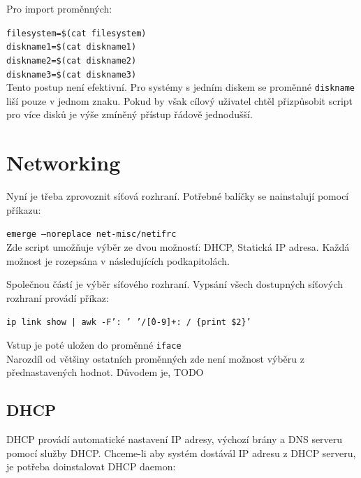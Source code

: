 \documentclass[12pt,a4paper,twoside,]{article}
\begin{document}
\hspace*{-1.5em}Pro import proměnných:

\texttt{filesystem=\$(cat filesystem)}\\
\hspace*{1.5em}\texttt{diskname1=\$(cat diskname1)}\\
\hspace*{1.5em}\texttt{diskname2=\$(cat diskname2)}\\
\hspace*{1.5em}\texttt{diskname3=\$(cat diskname3)}\\

\hspace*{-1.5em}Tento postup není efektivní. Pro systémy s jedním diskem se proměnné \texttt{diskname} liší pouze v jednom znaku. Pokud by však cílový uživatel chtěl přizpůsobit script pro více disků je výše zmíněný přístup řádově jednodušší.

\newpage

\section{\textsf{Networking}}

Nyní je třeba zprovoznit síťová rozhraní. Potřebné balíčky se nainstalují pomocí příkazu:

\texttt{emerge --noreplace net-misc/netifrc}\\


\hspace{-1.5em}Zde script umožňuje výběr ze dvou možností: DHCP, Statická IP adresa. Každá možnost je rozepsána v následujících podkapitolách.

\hspace{-1.5em}Společnou částí je výběr síťového rozhraní. Vypsání všech dostupných síťových rozhraní provádí příkaz:

\texttt{ip link show | awk -F': ' '/\^[0-9]+: / \{print \$2\}'}

\hspace{-1.5em}Vstup je poté uložen do proměnné \texttt{iface}\\
Narozdíl od většiny ostatních proměnných zde není možnost výběru z přednastavených hodnot. Důvodem je, TODO
\subsection{\textsf{DHCP}}
DHCP provádí automatické nastavení IP adresy, výchozí brány a DNS serveru pomocí služby DHCP.
Chceme-li aby systém dostávál IP adresu z DHCP serveru, je potřeba doinstalovat DHCP daemon:
\end{document}
